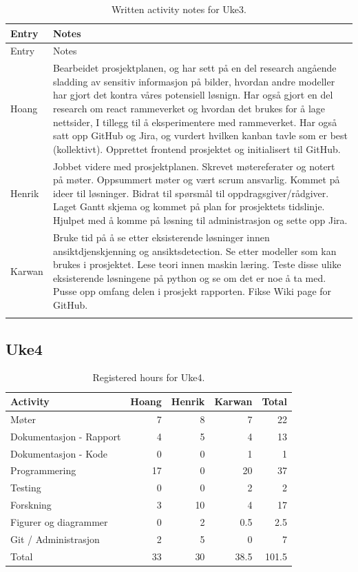 \begin{longtable}{p{}p{}}
\caption{Written activity notes for Uke3.}\\
\toprule
Entry & Notes \\
\midrule
\endfirsthead
\toprule
Entry & Notes \\
\midrule
\endhead
Hoang & Bearbeidet prosjektplanen, og har sett på en del research angående sladding av sensitiv informasjon på bilder, hvordan andre modeller har gjort det kontra våres potensiell løsnign. Har også gjort en del research om react rammeverket og hvordan det brukes for å lage nettsider, I tillegg til å eksperimentere med rammeverket. Har også satt opp GitHub og Jira, og vurdert hvilken kanban tavle som er best (kollektivt). Opprettet frontend prosjektet og initialisert til GitHub. \\
\addlinespace
Henrik & Jobbet videre med prosjektplanen. Skrevet møtereferater og notert på møter. Oppsummert møter og vært scrum ansvarlig. Kommet på ideer til løsninger. Bidrat til spørsmål til oppdragsgiver/rådgiver. Laget Gantt skjema og kommet på plan for prosjektets tidslinje. Hjulpet med å komme på løsning til administrasjon og sette opp Jira. \\
\addlinespace
Karwan & Bruke tid på å se etter eksisterende løsninger innen ansiktdjenskjenning og ansiktsdetection. Se etter modeller som kan brukes i prosjektet. Lese teori innen maskin læring. Teste disse ulike eksisterende løsningene på python og se om det er noe å ta med. Pusse opp omfang delen i prosjekt rapporten. Fikse Wiki page for GitHub. \\
\addlinespace
\bottomrule
\end{longtable}

\subsection{Uke4}

\begin{table}[H]
\centering
\small
\caption{Registered hours for Uke4.}
\label{tab:project-hours-uke4}
\begin{tabular}{lrrrr}
\toprule
Activity & Hoang & Henrik & Karwan & Total \\
\midrule
Møter & 7 & 8 & 7 & 22 \\
Dokumentasjon - Rapport & 4 & 5 & 4 & 13 \\
Dokumentasjon - Kode & 0 & 0 & 1 & 1 \\
Programmering & 17 & 0 & 20 & 37 \\
Testing & 0 & 0 & 2 & 2 \\
Forskning & 3 & 10 & 4 & 17 \\
Figurer og diagrammer & 0 & 2 & 0.5 & 2.5 \\
Git / Administrasjon & 2 & 5 & 0 & 7 \\
\midrule
Total & 33 & 30 & 38.5 & 101.5 \\
\bottomrule
\end{tabular}
\end{table}

